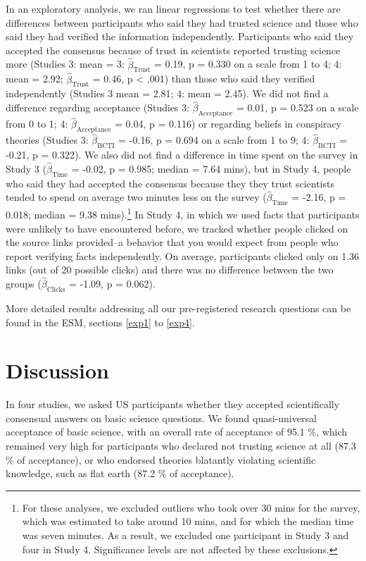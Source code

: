 \documentclass[
  doc,floatsintext]{apa6}
\begin{document}
In an exploratory analysis, we ran linear regressions to test whether there are differences between participants who said they had trusted science and those who said they had verified the information independently. Participants who said they accepted the consensus because of trust in scientists reported trusting science more (Studies 3: mean = 3; \(\hat{\beta}_{\text{Trust}}\) = 0.19, p = 0.330 on a scale from 1 to 4; 4: mean = 2.92; \(\hat{\beta}_{\text{Trust}}\) = 0.46, p \textless{} .001) than those who said they verified independently (Studies 3 mean = 2.81; 4: mean = 2.45). We did not find a difference regarding acceptance (Studies 3: \(\hat{\beta}_{\text{Acceptance}}\) = 0.01, p = 0.523 on a scale from 0 to 1; 4: \(\hat{\beta}_{\text{Acceptance}}\) = 0.04, p = 0.116) or regarding beliefs in conspiracy theories (Studies 3: \(\hat{\beta}_{\text{BCTI}}\) = -0.16, p = 0.694 on a scale from 1 to 9; 4: \(\hat{\beta}_{\text{BCTI}}\) = -0.21, p = 0.322). We also did not find a difference in time spent on the survey in Study 3 (\(\hat{\beta}_{\text{Time}}\) = -0.02, p = 0.985; median = 7.64 mins), but in Study 4, people who said they had accepted the consensus because they they trust scientists tended to spend on average two minutes less on the survey (\(\hat{\beta}_{\text{Time}}\) = -2.16, p = 0.018; median = 9.38 mins).\footnote{For these analyses, we excluded outliers who took over 30 mins for the survey, which was estimated to take around 10 mins, and for which the median time was seven minutes. As a result, we excluded one participant in Study 3 and four in Study 4. Significance levels are not affected by these exclusions.} In Study 4, in which we used facts that participants were unlikely to have encountered before, we tracked whether people clicked on the source links provided--a behavior that you would expect from people who report verifying facts independently. On average, participants clicked only on 1.36 links (out of 20 possible clicks) and there was no difference between the two groups (\(\hat{\beta}_{\text{Clicks}}\) = -1.09, p = 0.062).

More detailed results addressing all our pre-registered research questions can be found in the ESM, sections \ref{exp1} to \ref{exp4}.

\section{Discussion}\label{discussion}

In four studies, we asked US participants whether they accepted scientifically consensual answers on basic science questions. We found quasi-universal acceptance of basic science, with an overall rate of acceptance of 95.1 \%, which remained very high for participants who declared not trusting science at all (87.3 \% of acceptance), or who endorsed theories blatantly violating scientific knowledge, such as flat earth (87.2 \% of acceptance).
\end{document}
